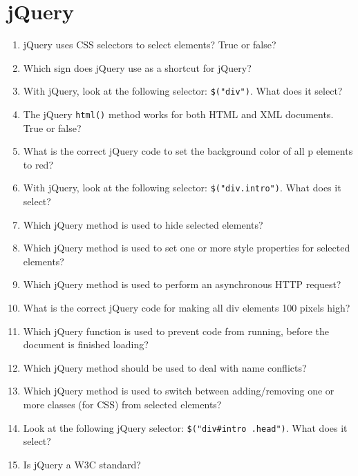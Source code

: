 \documentclass[spanish,a4paper,11pt]{article}
\begin{document}
\section{jQuery}
\begin{enumerate}
\item 
jQuery uses CSS selectors to select elements? True or false?
\item 
Which sign does jQuery use as a shortcut for jQuery?
\item 
With jQuery, look at the following selector: \verb|$("div")|. What does it select?
\item 
The jQuery \verb|html()| method works for both HTML and XML documents. True or false?
\item 
What is the correct jQuery code to set the background color of all p elements to red?
\item 
With jQuery, look at the following selector: \verb|$("div.intro")|. What does it select?
\item 
Which jQuery method is used to hide selected elements?
\item 
Which jQuery method is used to set one or more style properties for selected elements?
\item 
Which jQuery method is used to perform an asynchronous HTTP request?
\item 
What is the correct jQuery code for making all div elements 100 pixels high?
\item 
Which jQuery function is used to prevent code from running, before the document is finished loading?
\item 
Which jQuery method should be used to deal with name conflicts?
\item 
Which jQuery method is used to switch between adding/removing one or more classes (for CSS) from selected elements?
\item 
Look at the following jQuery selector: \verb|$("div#intro .head")|. What does it select?
\item 
Is jQuery a W3C standard?
\end{enumerate}
\end{document}
